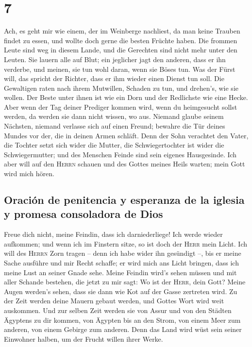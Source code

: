 \hypertarget{section-6}{%
\section{7}\label{section-6}}

 Ach, es geht mir wie einem, der im Weinberge nachliest,
da man keine Trauben findet zu essen, und wollte doch gerne die besten
Früchte haben.  Die frommen Leute sind weg in diesem
Lande, und die Gerechten sind nicht mehr unter den Leuten. Sie lauern
alle auf Blut; ein jeglicher jagt den anderen, dass er ihn verderbe,
 und meinen, sie tun wohl daran, wenn sie Böses tun. Was
der Fürst will, das spricht der Richter, dass er ihm wieder einen Dienst
tun soll. Die Gewaltigen raten nach ihrem Mutwillen, Schaden zu tun, und
drehen's, wie sie wollen.  Der Beste unter ihnen ist wie
ein Dorn und der Redlichste wie eine Hecke. Aber wenn der Tag deiner
Prediger kommen wird, wenn du heimgesucht sollst werden, da werden sie
dann nicht wissen, wo aus.  Niemand glaube seinem
Nächsten, niemand verlasse sich auf einen Freund; bewahre die Tür deines
Mundes vor der, die in deinen Armen schläft.  Denn der
Sohn verachtet den Vater, die Tochter setzt sich wider die Mutter, die
Schwiegertochter ist wider die Schwiegermutter; und des Menschen Feinde
sind sein eigenes Hausgesinde.  Ich aber will auf den
\textsc{Herrn} schauen und des Gottes meines Heils warten; mein Gott
wird mich hören.

\hypertarget{oraciuxf3n-de-penitencia-y-esperanza-de-la-iglesia-y-promesa-consoladora-de-dios}{%
\subsection{Oración de penitencia y esperanza de la iglesia y promesa
consoladora de
Dios}\label{oraciuxf3n-de-penitencia-y-esperanza-de-la-iglesia-y-promesa-consoladora-de-dios}}

 Freue dich nicht, meine Feindin, dass ich darniederliege!
Ich werde wieder aufkommen; und wenn ich im Finstern sitze, so ist doch
der \textsc{Herr} mein Licht.  Ich will des \textsc{Herrn}
Zorn tragen -- denn ich habe wider ihn gesündigt --, bis er meine Sache
ausführe und mir Recht schaffe; er wird mich ans Licht bringen, dass ich
meine Lust an seiner Gnade sehe.  Meine Feindin wird's
sehen müssen und mit aller Schande bestehen, die jetzt zu mir sagt: Wo
ist der \textsc{Herr}, dein Gott? Meine Augen werden's sehen, dass sie
dann wie Kot auf der Gasse zertreten wird.  Zu der Zeit
werden deine Mauern gebaut werden, und Gottes Wort wird weit auskommen.
 Und zur selben Zeit werden sie von Assur und von den
Städten Ägyptens zu dir kommen, von Ägypten bis an den Strom, von einem
Meer zum anderen, von einem Gebirge zum anderen.  Denn
das Land wird wüst sein seiner Einwohner halben, um der Frucht willen
ihrer Werke.

